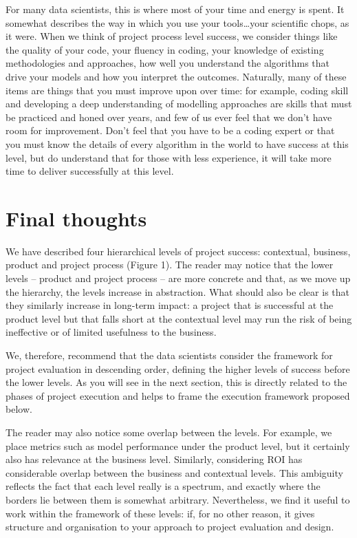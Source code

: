 \documentclass[
]{book}
\begin{document}
For many data scientists, this is where most of your time and energy is spent. It somewhat describes the way in which you use your tools\ldots your scientific chops, as it were. When we think of project process level success, we consider things like the quality of your code, your fluency in coding, your knowledge of existing methodologies and approaches, how well you understand the algorithms that drive your models and how you interpret the outcomes. Naturally, many of these items are things that you must improve upon over time: for example, coding skill and developing a deep understanding of modelling approaches are skills that must be practiced and honed over years, and few of us ever feel that we don't have room for improvement. Don't feel that you have to be a coding expert or that you must know the details of every algorithm in the world to have success at this level, but do understand that for those with less experience, it will take more time to deliver successfully at this level.

\hypertarget{final-thoughts}{%
\section{Final thoughts}\label{final-thoughts}}

We have described four hierarchical levels of project success: contextual, business, product and project process (Figure 1). The reader may notice that the lower levels -- product and project process -- are more concrete and that, as we move up the hierarchy, the levels increase in abstraction. What should also be clear is that they similarly increase in long-term impact: a project that is successful at the product level but that falls short at the contextual level may run the risk of being ineffective or of limited usefulness to the business.

We, therefore, recommend that the data scientists consider the framework for project evaluation in descending order, defining the higher levels of success before the lower levels. As you will see in the next section, this is directly related to the phases of project execution and helps to frame the execution framework proposed below.

The reader may also notice some overlap between the levels. For example, we place metrics such as model performance under the product level, but it certainly also has relevance at the business level. Similarly, considering ROI has considerable overlap between the business and contextual levels. This ambiguity reflects the fact that each level really is a spectrum, and exactly where the borders lie between them is somewhat arbitrary. Nevertheless, we find it useful to work within the framework of these levels: if, for no other reason, it gives structure and organisation to your approach to project evaluation and design.
\end{document}

